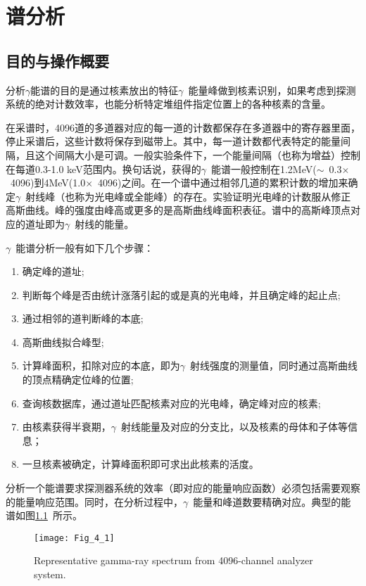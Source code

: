 \chapter{谱分析}

\section{目的与操作概要}

分析$\gamma$能谱的目的是通过核素放出的特征$\gamma$\ 能量峰做到核素识别，如果考虑到探测系统的绝对计数效率，也能分析特定堆组件指定位置上的各种核素的含量。

在采谱时，4096道的多道器对应的每一道的计数都保存在多道器中的寄存器里面，停止采谱后，这些计数将保存到磁带上。其中，每一道计数都代表特定的能量间隔，且这个间隔大小是可调。一般实验条件下，一个能量间隔（也称为增益）控制在每道0.3-1.0 keV范围内。换句话说，获得的$\gamma$\ 能谱一般控制在1.2MeV($\sim$\ 0.3$\times$\ 4096)到4MeV(1.0$\times$\ 4096)之间。在一个谱中通过相邻几道的累积计数的增加来确定$\gamma$\ 射线峰（也称为光电峰或全能峰）的存在。实验证明光电峰的计数服从修正高斯曲线。峰的强度由峰高或更多的是高斯曲线峰面积表征。谱中的高斯峰顶点对应的道址即为$\gamma$\ 射线的能量。

$\gamma$\ 能谱分析一般有如下几个步骤：
\begin{enumerate}
\item 确定峰的道址;
\item 判断每个峰是否由统计涨落引起的或是真的光电峰，并且确定峰的起止点;
\item 通过相邻的道判断峰的本底;
\item 高斯曲线拟合峰型;
\item 计算峰面积，扣除对应的本底，即为$\gamma$\ 射线强度的测量值，同时通过高斯曲线的顶点精确定位峰的位置;
\item 查询核数据库，通过道址匹配核素对应的光电峰，确定峰对应的核素;
\item 由核素获得半衰期，$\gamma$\ 射线能量及对应的分支比，以及核素的母体和子体等信息；
\item 一旦核素被确定，计算峰面积即可求出此核素的活度。
\end{enumerate}

分析一个能谱要求探测器系统的效率（即对应的能量响应函数）必须包括需要观察的能量响应范围。同时，在分析过程中，$\gamma$\ 能量和峰道数要精确对应。典型的能谱如图\ref{Fig_4_1}\ 所示。

\begin{figure}
\centering
\texttt{[image: Fig\_4\_1]}
\caption{Representative gamma-ray spectrum from 4096-channel analyzer system.}
\label{Fig_4_1}
\end{figure}

